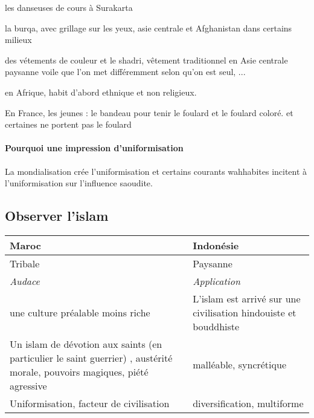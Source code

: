 \bi
\item les danseuses de cours à Surakarta
\item la burqa, avec grillage sur les yeux, asie centrale et Afghanistan dans certains milieux
\item des vétements de couleur et le shadri, vêtement traditionnel en Asie centrale paysanne voile que l'on met différemment selon qu'on est seul, ...
\item en Afrique, habit d'abord ethnique et non religieux. 
\item En France, les jeunes : le bandeau pour tenir le foulard et le foulard coloré. et certaines ne portent pas le foulard
\ei 

\paragraph{Pourquoi une impression d'uniformisation} La mondialisation crée l'uniformisation et certains courants wahhabites incitent à l'uniformisation sur l'influence saoudite.

\subsection{Observer l'islam}

 
\newlength\q
\setlength{}

\begin{table}[h!]
\noindent\begin{tabular}{p{\q}p{\q}}
\toprule
\textbf{Maroc}                                                     & \textbf{Indonésie}                                               \\ 
\midrule
Tribale                                                            & Paysanne                                                         \\
\textit{Audace}                                                    & \textit{Application}                                             \\
une culture préalable moins riche                                  & L'islam est arrivé sur une civilisation hindouiste et bouddhiste \\
Un islam de dévotion aux saints (en particulier le saint guerrier) , austérité morale, pouvoirs magiques, piété agressive & malléable, syncrétique  \\
Uniformisation, facteur de civilisation & diversification, multiforme\\

\bottomrule
\end{tabular}
\end{table}

